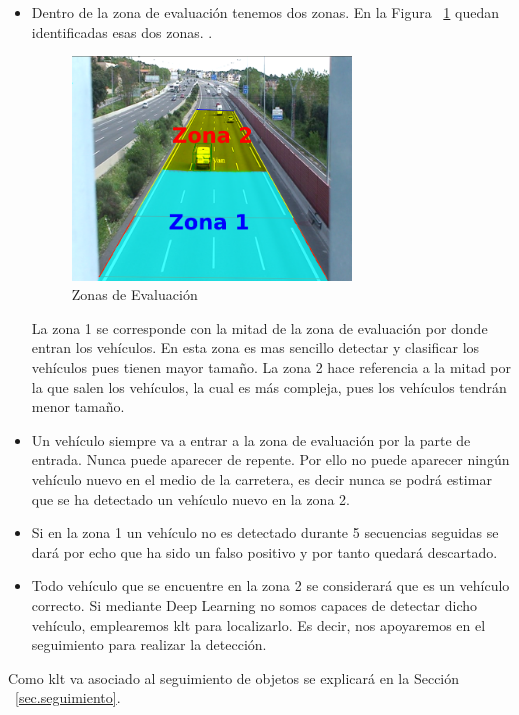 \begin{itemize}
    \item Dentro de la zona de evaluación tenemos dos zonas. En la
     Figura ~\ref{fig.zona_evaluacion} quedan identificadas esas dos zonas.
.    \begin{figure}[H] 
\begin{center}
	\includegraphics[width=0.7\textwidth]{figures/Diseno_global/zonas_evaluacion.png}
   \caption{Zonas de Evaluación}
	\label{fig.zona_evaluacion}
\end{center}
\end{figure}
    La zona 1 se corresponde con la mitad de la zona de evaluación por donde entran los vehículos. En esta zona es mas sencillo detectar y clasificar los vehículos pues tienen mayor tamaño. La zona 2 hace referencia a la mitad por la que salen los vehículos, la cual es más compleja, pues los vehículos tendrán menor tamaño.
    \item Un vehículo siempre va a entrar a la zona de evaluación por la parte de entrada. Nunca puede aparecer de repente. Por ello no puede aparecer ningún vehículo nuevo en el medio de la carretera, es decir nunca se podrá estimar que se ha detectado un vehículo nuevo en la zona 2.
    \item Si en la zona 1 un vehículo no es detectado durante 5 secuencias seguidas se dará por echo que ha sido un falso positivo y por tanto quedará descartado.
    \item Todo vehículo que se encuentre en la zona 2 se considerará que es un vehículo correcto. Si mediante Deep Learning no somos capaces de detectar dicho vehículo, emplearemos \acrshort{klt} para localizarlo. Es decir, nos apoyaremos en el seguimiento para realizar la detección.
\end{itemize}

Como \acrshort{klt} va asociado al seguimiento de objetos se explicará en la Sección ~\ref{sec.seguimiento}.


